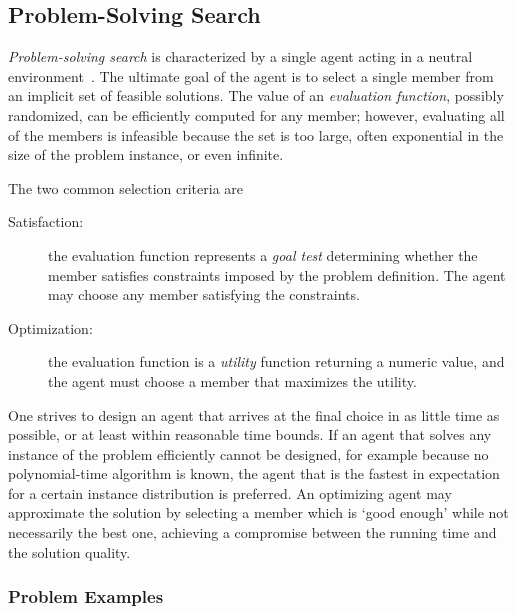 \subsection{Problem-Solving Search}

{\em Problem-solving search} is characterized by a single agent acting
in a neutral environment~\cite{Russell.aima}. The ultimate goal of the
agent is to select a single member from an implicit set of feasible
solutions. The value of an {\em evaluation function}, possibly
randomized, can be efficiently computed for any member; however,
evaluating all of the members is infeasible because the set is too
large, often exponential in the size of the problem instance, or
even infinite.

The two common selection criteria are 
\begin{description}
  \item[Satisfaction:] the evaluation function represents a {\em goal
    test} determining whether the member satisfies constraints imposed
    by the problem definition. The agent may choose any member
    satisfying the constraints.

  \item[Optimization:] the evaluation function is a {\em utility} function
    returning a numeric value, and the agent must choose a member that
    maximizes the utility.
\end{description}

One strives to design an agent that arrives at the final choice in as
little time as possible, or at least within reasonable time bounds.
If an agent that solves any instance of the problem efficiently cannot
be designed, for example because no polynomial-time algorithm is
known, the agent that is the fastest in expectation for a certain
instance distribution is preferred.  An optimizing agent may
approximate the solution by selecting a member which is `good enough'
while not necessarily the best one, achieving a compromise between the
running time and the solution quality.

\subsubsection{Problem Examples}

